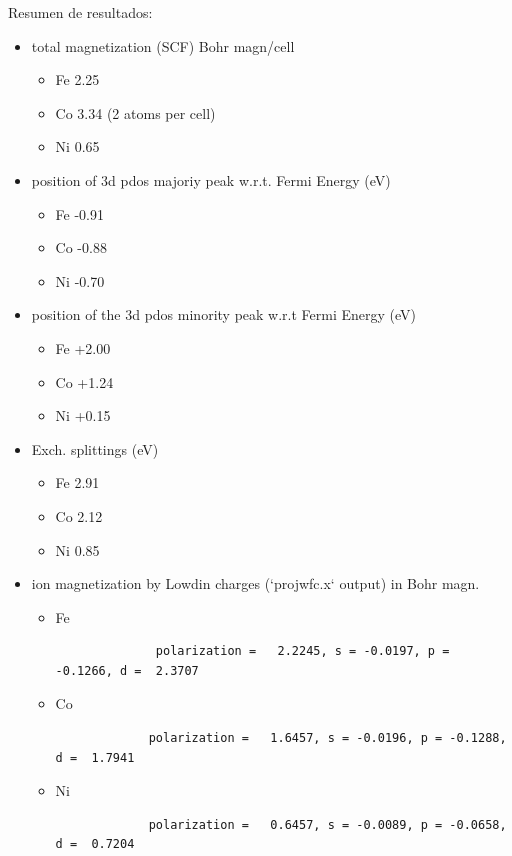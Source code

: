   Resumen de resultados:
    \begin{itemize}
      \item total magnetization (SCF) Bohr magn/cell
        \begin{itemize}
          \item Fe    2.25
          \item Co    3.34  (2 atoms per cell)
          \item Ni    0.65
        \end{itemize}
      \item position of 3d pdos majoriy peak  w.r.t. Fermi Energy (eV)
        \begin{itemize}
          \item Fe  -0.91
          \item Co  -0.88
          \item Ni  -0.70
        \end{itemize}
      \item position of the 3d pdos minority peak w.r.t Fermi Energy (eV)
        \begin{itemize}
          \item Fe      +2.00
          \item Co      +1.24
          \item Ni      +0.15
        \end{itemize}
      \item Exch. splittings  (eV)
        \begin{itemize}
          \item Fe  2.91
          \item Co  2.12
          \item Ni  0.85
        \end{itemize}
      \item ion magnetization by Lowdin charges (`projwfc.x` output) in Bohr magn.
        \begin{itemize}
          \item Fe
              \begin{verbatim}
              polarization =   2.2245, s = -0.0197, p = -0.1266, d =  2.3707
              \end{verbatim}
           \item Co
           \begin{verbatim}
             polarization =   1.6457, s = -0.0196, p = -0.1288, d =  1.7941
           \end{verbatim}
           \item Ni
           \begin{verbatim}
             polarization =   0.6457, s = -0.0089, p = -0.0658, d =  0.7204
           \end{verbatim}
        \end{itemize}
    \end{itemize}


